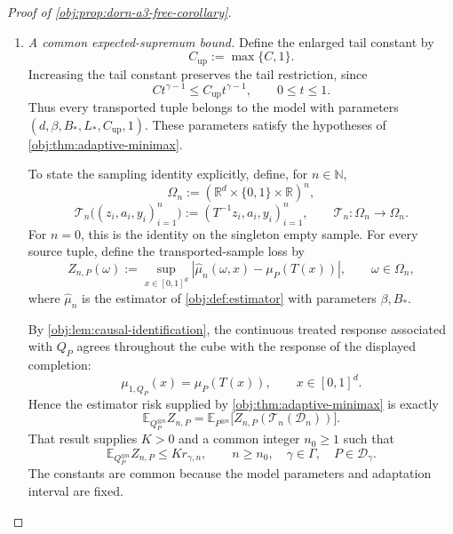 \begin{proof}[Proof of \cref{obj:prop:dorn-a3-free-corollary}]
\begin{enumerate}
Finally, the product construction and its affine transport give
\[
Y=AY(1)+(1-A)Y(0)
\quad\text{almost surely},
\qquad
(Y(0),Y(1))\perp A\mid X^T.
\]
These are \cref{obj:ass:consistency,obj:ass:exchangeability}. Together with the density, tail, response-bound, and smoothness calculations, they verify every restriction in \cref{obj:def:model}. Consequently,
\[
Q_P\in\mathcal P_\gamma
\quad\text{with}\quad
(B,L,C,c_f)=(B_*,L_*,C,1),
\]
with the exhibited causal completion \(\Pi_P^T\).

\item \emph{A common expected-supremum bound.}
Define the enlarged tail constant by
\[
C_{\mathrm{up}}:=\max\{C,1\}.
\]
Increasing the tail constant preserves the tail restriction, since
\[
Ct^{\gamma-1}\le C_{\mathrm{up}}t^{\gamma-1},
\qquad 0\le t\le1.
\]
Thus every transported tuple belongs to the model with parameters
\((d,\beta,B_*,L_*,C_{\mathrm{up}},1)\). These parameters satisfy the hypotheses of \cref{obj:thm:adaptive-minimax}.

To state the sampling identity explicitly, define, for \(n\in\mathbb N\),
\[
\Omega_n:=
(\mathbb R^d\times\{0,1\}\times\mathbb R)^n,
\]
\[
\mathcal T_n\bigl((z_i,a_i,y_i)_{i=1}^n\bigr)
:=
(T^{-1}z_i,a_i,y_i)_{i=1}^n,
\qquad
\mathcal T_n:\Omega_n\to\Omega_n.
\]
For \(n=0\), this is the identity on the singleton empty sample. For every source tuple, define the transported-sample loss by
\[
Z_{n,P}(\omega)
:=
\sup_{x\in[0,1]^d}
|\widehat\mu_n(\omega,x)-\mu_P(T(x))|,
\qquad \omega\in\Omega_n,
\]
where \(\widehat\mu_n\) is the estimator of \cref{obj:def:estimator} with parameters \(\beta,B_*\).

By \cref{obj:lem:causal-identification}, the continuous treated response associated with \(Q_P\) agrees throughout the cube with the response of the displayed completion:
\[
\mu_{1,Q_P}(x)=\mu_P(T(x)),
\qquad x\in[0,1]^d.
\]
Hence the estimator risk supplied by \cref{obj:thm:adaptive-minimax} is exactly
\[
\mathbb E_{Q_P^{\otimes n}}Z_{n,P}
=
\mathbb E_{P^{\otimes n}}
\bigl[Z_{n,P}(\mathcal T_n(\mathcal D_n))\bigr].
\]
That result supplies \(K>0\) and a common integer \(n_0\ge1\) such that
\[
\mathbb E_{Q_P^{\otimes n}}Z_{n,P}
\le K r_{\gamma,n},
\qquad
n\ge n_0,\quad \gamma\in\Gamma,\quad P\in\mathcal D_\gamma.
\]
The constants are common because the model parameters and adaptation interval are fixed.


\end{enumerate}
\end{proof}
